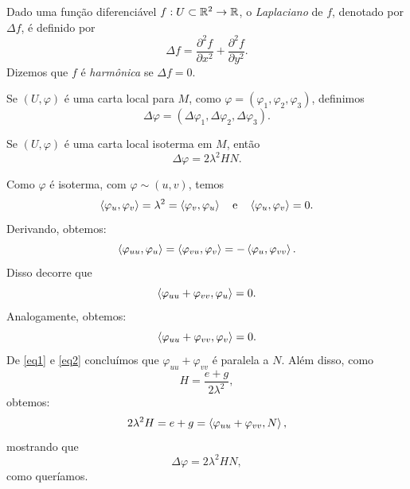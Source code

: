 \begin{definicao}
	Dado uma função diferenciável $f: U \subset \mathbb{R}^2 \rightarrow \mathbb{R}$, o \emph{Laplaciano} de $f$, denotado por $\Delta f$, é definido por
	\begin{equation*}
	\Delta f = \frac{\partial^2 f}{\partial x^2} + \frac{\partial^2 f}{\partial y^2}.
	\end{equation*}
	Dizemos que $f$ é \emph{harmônica} se $\Delta f = 0$.
	
	Se $(U, \varphi)$ é uma carta local para $M$, como $\varphi = (\varphi_1, \varphi_2, \varphi_3)$, definimos
	\begin{equation*}
	\Delta \varphi = (\Delta \varphi_1, \Delta \varphi_2, \Delta \varphi_3).
	\end{equation*}
\end{definicao}

\begin{proposicao}
	Se $(U, \varphi)$ é uma carta local isoterma em $M$, então 
	\begin{equation*}
	\Delta \varphi = 2 \lambda^2 H N.
	\end{equation*}
\end{proposicao}

\begin{demonstracao}
	Como $\varphi$ é isoterma, com $\varphi \sim (u, v)$, temos
	\begin{equation*}
	\left\langle \varphi_u,\varphi_v \right\rangle = \lambda^2 = \left\langle \varphi_v,\varphi_u \right\rangle \quad \text{e} \quad \left\langle \varphi_u,\varphi_v \right\rangle = 0.
	\end{equation*}
	Derivando, obtemos:
	\begin{equation*}
	\left\langle \varphi_{uu},\varphi_u \right\rangle = \left\langle \varphi_{vu},\varphi_v \right\rangle = - \left\langle \varphi_u,\varphi_{vv} \right\rangle.
	\end{equation*}
	Disso decorre que
	\begin{equation}\label{eq1}
	\left\langle \varphi_{uu} + \varphi_{vv},\varphi_u \right\rangle = 0.
	\end{equation}
	Analogamente, obtemos:
	\begin{equation}\label{eq2}
	\left\langle \varphi_{uu} + \varphi_{vv},\varphi_v \right\rangle = 0.
	\end{equation}
	De \eqref{eq1} e \eqref{eq2} concluímos que $\varphi_{uu} + \varphi_{vv}$ é paralela a $N$. Além disso, como
	\begin{equation}
	H = \frac{e+g}{2 \lambda^2},
	\end{equation}
	obtemos:
	\begin{equation*}
		2 \lambda^2 H = e + g = \left\langle \varphi_{uu} + \varphi_{vv},N \right\rangle,
	\end{equation*}
	mostrando que
	\begin{equation}
	\Delta \varphi = 2 \lambda^2 H N,
	\end{equation}
	como queríamos.
\end{demonstracao}

